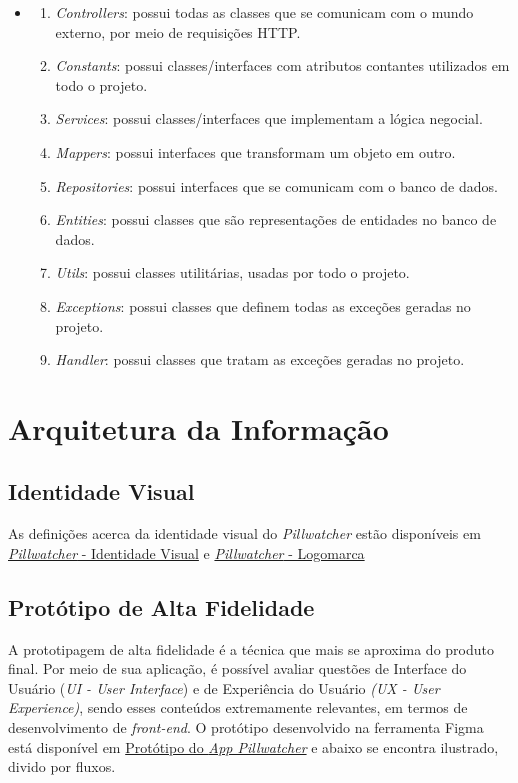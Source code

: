 \begin{itemize}
\item[]
    \begin{enumerate}
      \item \textit{Controllers}: possui todas as classes que se comunicam com o mundo externo, por meio de requisições HTTP.
      \item \textit{Constants}: possui classes/interfaces com atributos contantes utilizados em todo o projeto.
      \item \textit{Services}: possui classes/interfaces que implementam a lógica negocial.
      \item \textit{Mappers}: possui interfaces que transformam um objeto em outro.
      \item \textit{Repositories}: possui interfaces que se comunicam com o banco de dados.
      \item \textit{Entities}: possui classes que são representações de entidades no banco de dados.
      \item \textit{Utils}: possui classes utilitárias, usadas por todo o projeto.
      \item \textit{Exceptions}: possui classes que definem todas as exceções geradas no projeto.
      \item \textit{Handler}: possui classes que tratam as exceções geradas no projeto.
    \end{enumerate}
\end{itemize}

\section{Arquitetura da Informação}

\subsection{Identidade Visual}
As definições acerca da identidade visual do \emph{Pillwatcher} estão disponíveis em \href{https://github.com/PillWatcher/Documentacao/wiki/Identidade-Visual}{\emph{Pillwatcher} - Identidade Visual} e \href{https://github.com/PillWatcher/Documentacao/wiki/Logomarca}{\emph{Pillwatcher} - Logomarca}

\subsection{Protótipo de Alta Fidelidade}
A prototipagem de alta fidelidade é a técnica que mais se aproxima do produto final. Por meio de sua aplicação, é possível avaliar questões de Interface do Usuário (\emph{UI -  User Interface}) e de Experiência do Usuário \emph{(UX - User Experience)}, sendo esses conteúdos extremamente relevantes, em termos de desenvolvimento de \textit{front-end}. O protótipo desenvolvido na ferramenta Figma está disponível em \href{https://www.figma.com/proto/60dT2EKBbcIPKy5Tg0Zzpg/App_Pillwatcher?node-id=1\%3A5\&scaling=scale-down}{Protótipo do \emph{App Pillwatcher}} e abaixo se encontra ilustrado, divido por fluxos.  

